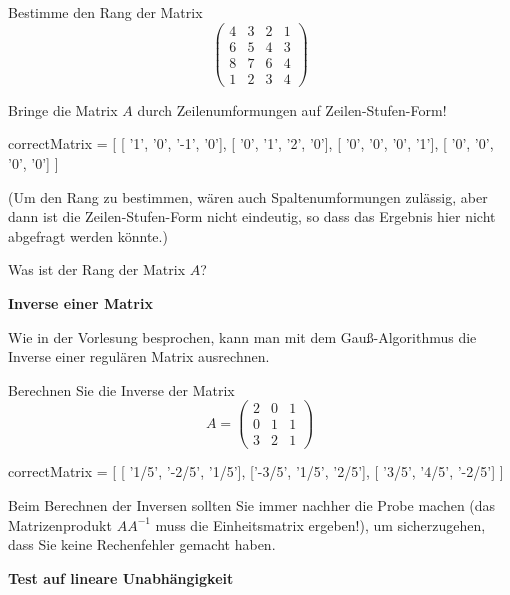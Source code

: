 \documentclass{ximera}
\begin{document}
\begin{question}
    Bestimme den Rang der Matrix
\[
\left(
\begin{array}{cccc}
 4&3&2&1  \\
 6&5&4&3  \\
 8&7&6&4  \\
 1&2&3&4   
\end{array}
\right)
\]

\begin{solution}
Bringe die Matrix $A$ durch Zeilenumformungen auf Zeilen-Stufen-Form!
\begin{matrix-answer}
correctMatrix = [ [ '1',  '0', '-1',  '0'],
[ '0',  '1',  '2',  '0'],
[ '0',  '0',  '0',  '1'],
[ '0',  '0',  '0',  '0'] ]
\end{matrix-answer}
(Um den Rang zu bestimmen, wären auch Spaltenumformungen zulässig, aber dann ist die Zeilen-Stufen-Form nicht eindeutig, so dass das Ergebnis hier nicht abgefragt werden könnte.)    
\end{solution}

\begin{solution}
Was ist der Rang der Matrix $A$? 
\end{solution}
\end{question}


\textbf{Inverse einer Matrix}

Wie in der Vorlesung besprochen, kann man mit dem Gauß-Algorithmus die Inverse einer regulären Matrix ausrechnen.

\begin{question}
    Berechnen Sie die Inverse der Matrix
\[
A = \left(
\begin{array}{ccc}
2 & 0 & 1 \\
0 & 1 & 1 \\
3 & 2 & 1
\end{array}
\right)
\]

\begin{solution}
    \begin{matrix-answer}
correctMatrix = [
[ '1/5', '-2/5',  '1/5'],
['-3/5',  '1/5',  '2/5'],
[ '3/5',  '4/5', '-2/5']
]
    \end{matrix-answer}
\end{solution}
Beim Berechnen der Inversen sollten Sie immer nachher die Probe machen (das Matrizenprodukt $AA^{-1}$ muss die Einheitsmatrix ergeben!), um sicherzugehen, dass Sie keine Rechenfehler gemacht haben.
\end{question}

\textbf{Test auf lineare Unabhängigkeit}
\end{document}
